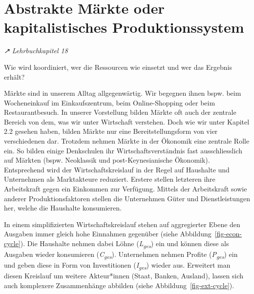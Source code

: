 \documentclass[
  nswissgerman,
  a4paper,
  DIV=11,
  numbers=noendperiod,
  oneside,
  openany]{scrreprt}
\begin{document}
\section{Abstrakte Märkte oder kapitalistisches
Produktionssystem}\label{abstrakte-muxe4rkte-oder-kapitalistisches-produktionssystem}

\emph{↗ Lehrbuchkapitel 18}

\begin{tcolorbox}[enhanced jigsaw, arc=.35mm, bottomrule=.15mm, bottomtitle=1mm, breakable, colback=white, colbacktitle=quarto-callout-note-color!10!white, colframe=quarto-callout-note-color-frame, coltitle=black, left=2mm, leftrule=.75mm, opacityback=0, opacitybacktitle=0.6, rightrule=.15mm, title={Leitfrage}, titlerule=0mm, toprule=.15mm, toptitle=1mm]

Wie wird koordiniert, wer die Ressourcen wie einsetzt und wer das
Ergebnis erhält?

\end{tcolorbox}

Märkte sind in unserem Alltag allgegenwärtig. Wir begegnen ihnen bspw.
beim Wocheneinkauf im Einkaufszentrum, beim Online-Shopping oder beim
Restaurantbesuch. In unserer Vorstellung bilden Märkte oft auch der
zentrale Bereich von dem, was wir unter Wirtschaft verstehen. Doch wie
wir unter Kapitel 2.2 gesehen haben, bilden Märkte nur eine
Bereitstellungsform von vier verschiedenen dar. Trotzdem nehmen Märkte
in der Ökonomik eine zentrale Rolle ein. So bilden einige Denkschulen
ihr Wirtschaftsverständnis fast ausschliesslich auf Märkten (bspw.
Neoklassik und post-Keynesianische Ökonomik). Entsprechend wird der
Wirtschaftskreislauf in der Regel auf Haushalte und Unternehmen als
Marktakteure reduziert. Erstere stellen letzteren ihre Arbeitskraft
gegen ein Einkommen zur Verfügung. Mittels der Arbeitskraft sowie
anderer Produktionsfaktoren stellen die Unternehmen Güter und
Dienstleistungen her, welche die Haushalte konsumieren.

In einem simplifizierten Wirtschaftskreislauf stehen auf aggregierter
Ebene den Ausgaben immer gleich hohe Einnahmen gegenüber (siehe
Abbildung~\ref{fig-econ-cycle}). Die Haushalte nehmen dabei Löhne
(\emph{L\textsubscript{ges}}) ein und können diese als Ausgaben wieder
konsumieren (\emph{C\textsubscript{ges}}). Unternehmen nehmen Profite
(\emph{P\textsubscript{ges}}) ein und geben diese in Form von
Investitionen (\emph{I\textsubscript{ges}}) wieder aus. Erweitert man
diesen Kreislauf um weitere Akteur*innen (Staat, Banken, Ausland),
lassen sich auch komplexere Zusammenhänge abbilden (siehe
Abbildung~\ref{fig-ext-cycle}).
\end{document}
